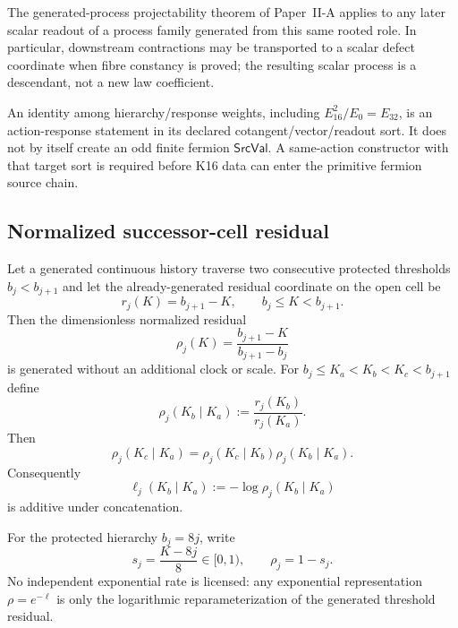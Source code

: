 \documentclass[12pt,a4paper]{article}
\begin{document}
The generated-process projectability theorem of Paper~II-A applies to any
later scalar readout of a process family generated from this same rooted role.
In particular, downstream contractions may be transported to a scalar defect
coordinate when fibre constancy is proved; the resulting scalar process is a
descendant, not a new law coefficient.


\begin{remark}
\label{p3a:rem:v182-k16-fermion-sort-firewall}
An identity among hierarchy/response weights, including
$E_{16}^2/E_0=E_{32}$, is an action-response statement in its declared
cotangent/vector/readout sort.  It does not by itself create an odd finite
fermion $\mathsf{SrcVal}$.  A same-action constructor with that target sort is
required before K16 data can enter the primitive fermion source chain.
\end{remark}



\subsection{Normalized successor-cell residual}
\label{p3a:sec:v184-successor-cell-residual}

\begin{theorem}
\label{p3a:thm:v184-normalized-successor-residual}
Let a generated continuous history traverse two consecutive protected
thresholds $b_j<b_{j+1}$ and let the already-generated residual coordinate on
the open cell be
\[
 r_j(K)=b_{j+1}-K,
 \qquad b_j\le K<b_{j+1}.
\]
Then the dimensionless normalized residual
\[
 \boxed{\rho_j(K)=\frac{b_{j+1}-K}{b_{j+1}-b_j}}
\]
is generated without an additional clock or scale.  For
$b_j\le K_a<K_b<K_c<b_{j+1}$ define
\[
 \rho_j(K_b\mid K_a)
 :=\frac{r_j(K_b)}{r_j(K_a)}.
\]
Then
\[
 \boxed{\rho_j(K_c\mid K_a)
 =\rho_j(K_c\mid K_b)\rho_j(K_b\mid K_a)}.
\]
Consequently
\[
 \boxed{\ell_j(K_b\mid K_a):=-\log\rho_j(K_b\mid K_a)}
\]
is additive under concatenation.
\end{theorem}

\begin{corollary}
\label{p3a:cor:v184-width-eight-cell}
For the protected hierarchy $b_j=8j$, write
\[
 s_j=\frac{K-8j}{8}\in[0,1),
 \qquad
 \rho_j=1-s_j.
\]
No independent exponential rate is licensed: any exponential representation
$\rho=e^{-\ell}$ is only the logarithmic reparameterization of the generated
threshold residual.
\end{corollary}
\end{document}
